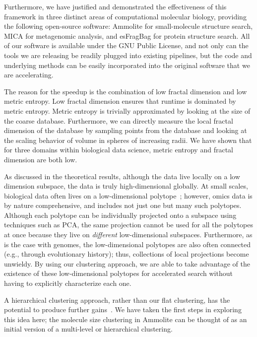 \documentclass[review,preprint,12pt]{elsarticle}
\renewcommand{\cite}{\citep} %
\theoremstyle{definition}
\theoremstyle{remark}
\numberwithin{equation}{section}
\begin{document}
Furthermore, we have justified and demonstrated the effectiveness of this 
framework in
three distinct areas of computational molecular biology, providing the
following open-source software: Ammolite for
small-molecule structure search, MICA for metagenomic analysis, and esFragBag for protein structure search.
All of our software is available under the GNU Public License, and not only can the tools we are 
releasing be readily plugged into existing pipelines, but the code and 
underlying methods can be easily incorporated into the original 
software that we are accelerating.

The reason for the speedup is the combination of low fractal dimension and low metric entropy.
Low fractal dimension ensures that runtime is dominated by metric entropy.
Metric entropy is trivially approximated by looking at the size of the coarse database.
Furthermore, we can directly measure the local fractal dimension of the database by sampling points from the database and looking at the scaling behavior of volume in spheres of increasing radii.
We have shown that for three domains within biological data science, metric entropy and fractal dimension are both low.

As discussed in the theoretical results, although the data live locally on a 
low dimension subspace, the data is truly high-dimensional globally.
At small scales, biological data often lives on a low-dimensional polytope~\cite{hart2015inferring}; however, omics data is by nature comprehensive, and includes not just one but many such polytopes.
Although each polytope can be individually projected onto a subspace using techniques such as PCA, the same projection cannot be used for all the polytopes at once because they live on \textit{different} low-dimensional 
subspaces.
Furthermore, as is the case with genomes, the low-dimensional polytopes are also often connected (e.g., through evolutionary history); thus, collections of local projections become unwieldy.
By using our clustering approach, we are able to take advantage of the existence of these low-dimensional polytopes for accelerated search without having to explicitly characterize each one.

A hierarchical clustering approach, rather than our flat clustering, has the
potential to produce further gains~\cite{loh2012compressive}.
We have taken the first steps in exploring this idea here; the
molecule size clustering in Ammolite can be thought of as an initial version of a multi-level or hierarchical clustering.
\end{document}
